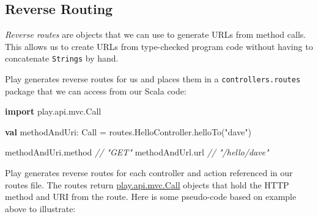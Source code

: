 \documentclass[oneside,11pt,a4paper,]{book}
\newenvironment{Shaded}{\begin{snugshade}}{\end{snugshade}}
\newcommand{\KeywordTok}[1]{\textcolor[rgb]{0.13,0.29,0.53}{\textbf{{#1}}}}
\newcommand{\StringTok}[1]{\textcolor[rgb]{0.31,0.60,0.02}{{#1}}}
\newcommand{\CommentTok}[1]{\textcolor[rgb]{0.56,0.35,0.01}{\textit{{#1}}}}
\newcommand{\FunctionTok}[1]{\textcolor[rgb]{0.00,0.00,0.00}{{#1}}}
\newcommand{\NormalTok}[1]{{#1}}
\begin{document}
\subsection{Reverse Routing}\label{reverse-routing}

\emph{Reverse routes} are objects that we can use to generate URLs from
method calls. This allows us to create URLs from type-checked program
code without having to concatenate \texttt{Strings} by hand.

Play generates reverse routes for us and places them in a
\texttt{controllers.routes} package that we can access from our Scala
code:

\begin{Shaded}
\begin{Highlighting}[]
\KeywordTok{import} \NormalTok{play.}\FunctionTok{api}\NormalTok{.}\FunctionTok{mvc}\NormalTok{.}\FunctionTok{Call}

\KeywordTok{val} \NormalTok{methodAndUri: Call = routes.}\FunctionTok{HelloController}\NormalTok{.}\FunctionTok{helloTo}\NormalTok{(}\StringTok{"dave"}\NormalTok{)}

\NormalTok{methodAndUri.}\FunctionTok{method} \CommentTok{// "GET"}
\NormalTok{methodAndUrl.}\FunctionTok{url}    \CommentTok{// "/hello/dave"}
\end{Highlighting}
\end{Shaded}

Play generates reverse routes for each controller and action referenced
in our routes file. The routes return
\href{https://www.playframework.com/documentation/2.3.x/api/scala/index.html\#play.api.mvc.Call}{play.api.mvc.Call}
objects that hold the HTTP method and URI from the route. Here is some
pseudo-code based on example above to illustrate:
\end{document}
